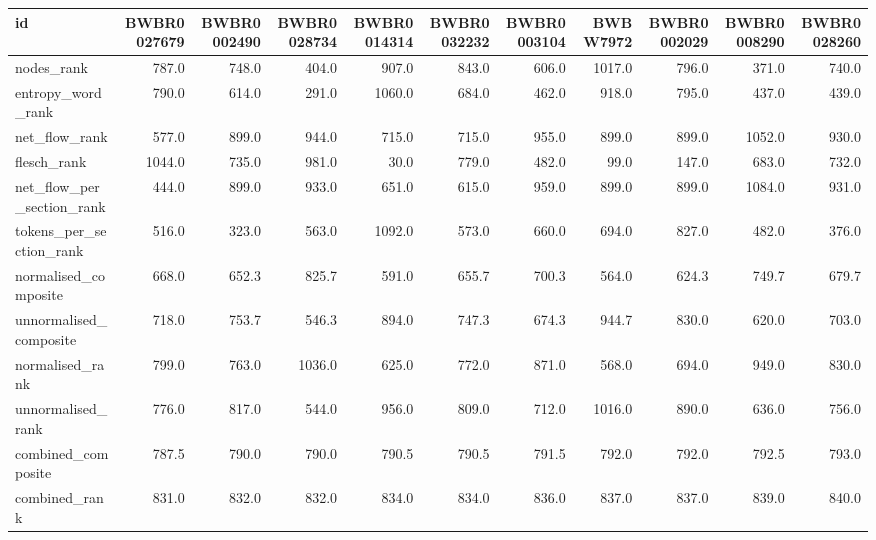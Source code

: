 \begin{tabular}{lrrrrrrrrrr}
\toprule
id & BWBR0027679 & BWBR0002490 & BWBR0028734 & BWBR0014314 & BWBR0032232 & BWBR0003104 & BWBW7972 & BWBR0002029 & BWBR0008290 & BWBR0028260 \\
\midrule
nodes\_rank & 787.0 & 748.0 & 404.0 & 907.0 & 843.0 & 606.0 & 1017.0 & 796.0 & 371.0 & 740.0 \\
\cline{1-11}
entropy\_word\_rank & 790.0 & 614.0 & 291.0 & 1060.0 & 684.0 & 462.0 & 918.0 & 795.0 & 437.0 & 439.0 \\
\cline{1-11}
net\_flow\_rank & 577.0 & 899.0 & 944.0 & 715.0 & 715.0 & 955.0 & 899.0 & 899.0 & 1052.0 & 930.0 \\
\cline{1-11}
flesch\_rank & 1044.0 & 735.0 & 981.0 & 30.0 & 779.0 & 482.0 & 99.0 & 147.0 & 683.0 & 732.0 \\
\cline{1-11}
net\_flow\_per\_section\_rank & 444.0 & 899.0 & 933.0 & 651.0 & 615.0 & 959.0 & 899.0 & 899.0 & 1084.0 & 931.0 \\
\cline{1-11}
tokens\_per\_section\_rank & 516.0 & 323.0 & 563.0 & 1092.0 & 573.0 & 660.0 & 694.0 & 827.0 & 482.0 & 376.0 \\
\cline{1-11}
normalised\_composite & 668.0 & 652.3 & 825.7 & 591.0 & 655.7 & 700.3 & 564.0 & 624.3 & 749.7 & 679.7 \\
\cline{1-11}
unnormalised\_composite & 718.0 & 753.7 & 546.3 & 894.0 & 747.3 & 674.3 & 944.7 & 830.0 & 620.0 & 703.0 \\
\cline{1-11}
normalised\_rank & 799.0 & 763.0 & 1036.0 & 625.0 & 772.0 & 871.0 & 568.0 & 694.0 & 949.0 & 830.0 \\
\cline{1-11}
unnormalised\_rank & 776.0 & 817.0 & 544.0 & 956.0 & 809.0 & 712.0 & 1016.0 & 890.0 & 636.0 & 756.0 \\
\cline{1-11}
combined\_composite & 787.5 & 790.0 & 790.0 & 790.5 & 790.5 & 791.5 & 792.0 & 792.0 & 792.5 & 793.0 \\
\cline{1-11}
combined\_rank & 831.0 & 832.0 & 832.0 & 834.0 & 834.0 & 836.0 & 837.0 & 837.0 & 839.0 & 840.0 \\
\cline{1-11}
\bottomrule
\end{tabular}
